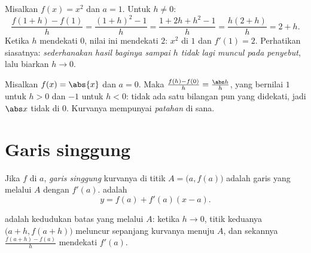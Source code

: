 \begin{example}\label{ex:g11:deriv:atpoint}
Misalkan $f(x) = x^2$ dan $a = 1$. Untuk $h \neq 0$:
\[
\frac{f(1+h) - f(1)}{h}
= \frac{(1+h)^2 - 1}{h}
= \frac{1 + 2h + h^2 - 1}{h}
= \frac{h(2 + h)}{h}
= 2 + h .
\]
Ketika $h$ mendekati $0$, nilai ini mendekati $2$:  $x^2$
 di $1$ dan $f'(1) = 2$. Perhatikan siasatnya:
\emph{sederhanakan hasil baginya sampai $h$ tidak lagi muncul pada penyebut},
lalu biarkan $h \to 0$.
\end{example}

\begin{example}
Misalkan $f(x) = \abs{x}$ dan $a = 0$. Maka
$\frac{f(h) - f(0)}{h} = \frac{\abs h}{h}$, yang bernilai $1$ untuk $h > 0$
dan $-1$ untuk $h < 0$: tidak ada satu bilangan pun yang didekati, jadi
$\abs x$ tidak  di $0$. Kurvanya mempunyai \emph{patahan} di sana.
\end{example}

\section{Garis singgung}

\begin{definition}\label{def:g11:deriv:tangent}
Jika $f$  di $a$, \emph{garis singgung}
kurvanya di titik $A = \bigl(a, f(a)\bigr)$ adalah garis yang melalui $A$
dengan  $f'(a)$.  adalah
\[
y = f(a) + f'(a)(x - a).
\]
\end{definition}

 adalah kedudukan batas  yang melalui $A$: ketika
$h \to 0$, titik keduanya $\bigl(a+h, f(a+h)\bigr)$ meluncur sepanjang
kurvanya menuju $A$, dan  sekannya $\frac{f(a+h)-f(a)}{h}$
mendekati $f'(a)$.

